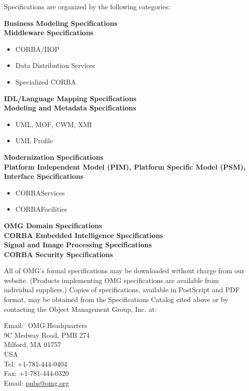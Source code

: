 Specifications are organized by the following categories:

{\bfseries{Business Modeling Specifications}}\\[\medskipamount]
{\bfseries{Middleware Specifications}}
\begin{itemize}
\item CORBA/IIOP
\item Data Distribution Services
\item Specialized CORBA
\end{itemize} 
{\bfseries{IDL/Language Mapping Specifications}}\\[\medskipamount]
{\bfseries{Modeling and Metadata Specifications}}
\begin{itemize}
\item UML, MOF, CWM, XMI
\item UML Profile
\end{itemize} 
{\bfseries{Modernization Specifications}}\\[\medskipamount]
{\bfseries{Platform Independent Model (PIM), Platform Specific Model (PSM), Interface Specifications}}
\begin{itemize}
\item CORBAServices
\item CORBAFacilities
\end{itemize}
{\bfseries{OMG Domain Specifications}}\\[\medskipamount]
{\bfseries{CORBA Embedded Intelligence Specifications}}\\[\medskipamount]
{\bfseries{Signal and Image Processing Specifications}}\\[\medskipamount]
{\bfseries{CORBA Security Specifications}}
 
All of OMG's formal specifications may be downloaded without charge from our website. (Products implementing OMG specifications are available from individual suppliers.) Copies of specifications, available in PostScript and PDF format, may be obtained from the Specifications Catalog cited above or by contacting the Object Management Group, Inc. at:

\begin{tabbing}
\quad\quad \= Email: \= \kill
\> OMG Headquarters\\
\> 9C Medway Road, PMB 274\\
\> Milford, MA 01757\\
\> USA\\
\> Tel: \> +1-781-444-0404\\
\> Fax: \> +1-781-444-0320\\
\> Email: \> \href{mailto:pubs@omg.org}{pubs@omg.org}
\end{tabbing}

